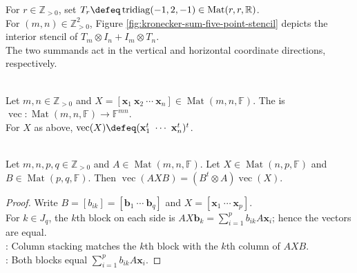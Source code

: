 For $r\in\mathbb{Z}_{>0}$, set $T_r\defeq\operatorname{tridiag}(-1,2,-1)\in\operatorname{Mat}(r,r,\mathbb{R})$.\\
For $(m,n)\in\mathbb{Z}_{>0}^2$, Figure \ref{fig:kronecker-sum-five-point-stencil} depicts the interior stencil of $T_m\otimes I_n+I_m\otimes T_n$.\\
The two summands act in the vertical and horizontal coordinate directions, respectively.

\begin{illustrationfigure}[H]
  \centering
  
  \caption{The two tridiagonal factors combine into center weight $4$ and four neighboring weights $-1$.}
  \label{fig:kronecker-sum-five-point-stencil}
\end{illustrationfigure}

\begin{definition} \label{def:vectorization-map} \\
Let $m,n\in\mathbb{Z}_{>0}$ and $X=[\mathbf{x}_1\ \mathbf{x}_2\ \cdots\ \mathbf{x}_n]\in\operatorname{Mat}(m,n,\mathbb{F})$. The  is $\operatorname{vec}\colon\operatorname{Mat}(m,n,\mathbb{F})\to\mathbb{F}^{mn}$.\\
For $X$ as above, $\operatorname{vec}(X)\defeq(\mathbf{x}_1^t\ \cdots\ \mathbf{x}_n^t)^t$.
\end{definition}

\begin{theorem} \label{thm:vectorization-of-triple-product} \\
Let $m,n,p,q\in\mathbb{Z}_{>0}$ and $A\in\operatorname{Mat}(m,n,\mathbb{F})$. Let $X\in\operatorname{Mat}(n,p,\mathbb{F})$ and $B\in\operatorname{Mat}(p,q,\mathbb{F})$. Then $\operatorname{vec}(AXB)=(B^t\otimes A)\operatorname{vec}(X)$.
\begin{proof}
Write $B=[b_{ik}]=[\mathbf{b}_1\ \cdots\ \mathbf{b}_q]$ and $X=[\mathbf{x}_1\ \cdots\ \mathbf{x}_p]$.\\
For $k\in J_q$, the $k$th block on each side is $AX\mathbf{b}_k=\sum\limits_{i=1}^{p}b_{ik}A\mathbf{x}_i$; hence the vectors are equal.\\
: Column stacking matches the $k$th block with the $k$th column of $AXB$.\\
: Both blocks equal $\sum\limits_{i=1}^{p}b_{ik}A\mathbf{x}_i$.
\end{proof}
\end{theorem}

